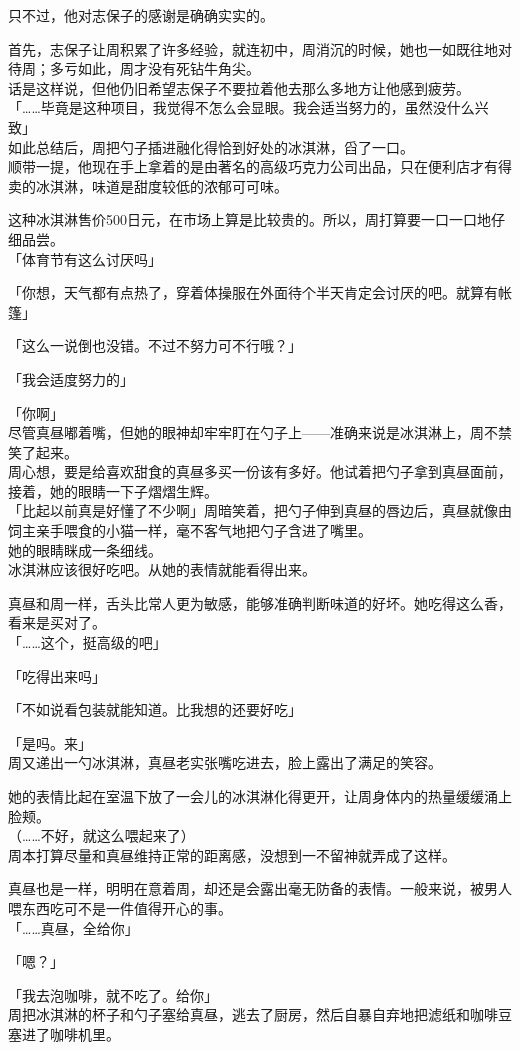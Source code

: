 只不过，他对志保子的感谢是确确实实的。

首先，志保子让周积累了许多经验，就连初中，周消沉的时候，她也一如既往地对待周；多亏如此，周才没有死钻牛角尖。\\

话是这样说，但他仍旧希望志保子不要拉着他去那么多地方让他感到疲劳。\\

「……毕竟是这种项目，我觉得不怎么会显眼。我会适当努力的，虽然没什么兴致」\\

如此总结后，周把勺子插进融化得恰到好处的冰淇淋，舀了一口。\\

顺带一提，他现在手上拿着的是由著名的高级巧克力公司出品，只在便利店才有得卖的冰淇淋，味道是甜度较低的浓郁可可味。

这种冰淇淋售价500日元，在市场上算是比较贵的。所以，周打算要一口一口地仔细品尝。\\

「体育节有这么讨厌吗」

「你想，天气都有点热了，穿着体操服在外面待个半天肯定会讨厌的吧。就算有帐篷」

「这么一说倒也没错。不过不努力可不行哦？」

「我会适度努力的」

「你啊」\\

尽管真昼嘟着嘴，但她的眼神却牢牢盯在勺子上——准确来说是冰淇淋上，周不禁笑了起来。\\

周心想，要是给喜欢甜食的真昼多买一份该有多好。他试着把勺子拿到真昼面前，接着，她的眼睛一下子熠熠生辉。\\

「比起以前真是好懂了不少啊」周暗笑着，把勺子伸到真昼的唇边后，真昼就像由饲主亲手喂食的小猫一样，毫不客气地把勺子含进了嘴里。\\

她的眼睛眯成一条细线。\\

冰淇淋应该很好吃吧。从她的表情就能看得出来。

真昼和周一样，舌头比常人更为敏感，能够准确判断味道的好坏。她吃得这么香，看来是买对了。\\

「……这个，挺高级的吧」

「吃得出来吗」

「不如说看包装就能知道。比我想的还要好吃」

「是吗。来」\\

周又递出一勺冰淇淋，真昼老实张嘴吃进去，脸上露出了满足的笑容。

她的表情比起在室温下放了一会儿的冰淇淋化得更开，让周身体内的热量缓缓涌上脸颊。\\

（……不好，就这么喂起来了）\\

周本打算尽量和真昼维持正常的距离感，没想到一不留神就弄成了这样。

真昼也是一样，明明在意着周，却还是会露出毫无防备的表情。一般来说，被男人喂东西吃可不是一件值得开心的事。\\

「……真昼，全给你」

「嗯？」

「我去泡咖啡，就不吃了。给你」\\

周把冰淇淋的杯子和勺子塞给真昼，逃去了厨房，然后自暴自弃地把滤纸和咖啡豆塞进了咖啡机里。
